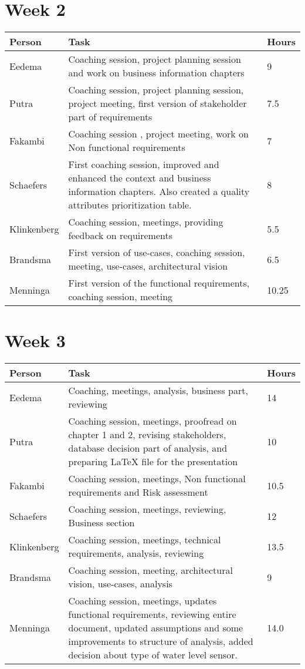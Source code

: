 \section{Week 2}
\begin{tabular}{L{0.2\textwidth} L{0.7\textwidth} L{0.1\textwidth}}
    \textbf{Person} & \textbf{Task} & \textbf{Hours} \\ \toprule
	Eedema & Coaching session, project planning session and work on business information chapters & 9  \\ \midrule
	Putra & Coaching session, project planning session, project meeting, first version of stakeholder part of requirements & 7.5 \\ \midrule
	Fakambi & Coaching session , project meeting, work on Non functional requirements & 7 \\ \midrule
	Schaefers & First coaching session, improved and enhanced the context and business information chapters. Also created a quality attributes prioritization table.& 8 \\ \midrule
	Klinkenberg & Coaching session, meetings, providing feedback on requirements & 5.5\\ \midrule
	Brandsma & First version of use-cases, coaching session, meeting, use-cases, architectural vision & 6.5 \\ \midrule
	Menninga & First version of the functional requirements, coaching session, meeting & 10.25 \\ \bottomrule
\end{tabular}

\section{Week 3}
\begin{tabular}{p{} p{} p{}}
   \textbf{Person} & \textbf{Task} & \textbf{Hours} \\ \midrule
	Eedema &  Coaching, meetings, analysis, business part, reviewing & 14  \\ \midrule
	Putra & Coaching session, meetings, proofread on chapter 1 and 2, revising stakeholders, database decision part of analysis, and preparing \LaTeX{} file for the presentation & 10 \\ \midrule
	Fakambi & Coaching session, meetings, Non functional requirements and Risk assessment & 10.5\\ \midrule
	Schaefers & Coaching session, meetings, reviewing, Business section & 12 \\ \midrule
	Klinkenberg & Coaching session, meetings, technical requirements, analysis, reviewing & 13.5 \\ \midrule
	Brandsma & Coaching session, meeting, architectural vision, use-cases, analysis & 9 \\ \midrule
	Menninga & Coaching session, meetings, updates functional requirements, reviewing entire document, updated assumptions and some improvements to structure of analysis, added decision about type of water level sensor. & 14.0 \\ \midrule
\end{tabular}

